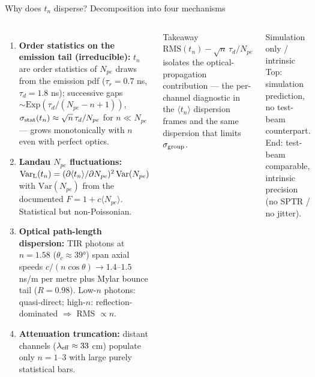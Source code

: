 \documentclass[aspectratio=169]{beamer}
\begin{document}
\begin{frame}{Why does $t_n$ disperse? Decomposition into four mechanisms}

\begin{columns}[T]
\begin{enumerate}\scriptsize
 \item \textbf{Order statistics on the emission tail (irreducible):}
       $t_n$ are order statistics of $N_{pe}$ draws from the emission pdf
       ($\tau_r=0.7$ ns, $\tau_d=1.8$ ns); successive gaps
       $\sim\mathrm{Exp}(\tau_d/(N_{pe}-n+1))$,
       $\sigma_{\rm stat}(t_n)\approx\sqrt{n}\,\tau_d/N_{pe}$ for $n\!\ll\!N_{pe}$
       --- grows monotonically with $n$ even with perfect optics.
 \item \textbf{Landau $N_{pe}$ fluctuations:}
       $\mathrm{Var}_{\rm L}(t_n)=(\partial\langle t_n\rangle/\partial N_{pe})^2\,\mathrm{Var}(N_{pe})$
       with $\mathrm{Var}(N_{pe})$ from the documented $F=1+c\langle N_{pe}\rangle$.
       Statistical but non-Poissonian.
 \item \textbf{Optical path-length dispersion:}
       TIR photons at $n=1.58$ ($\theta_c\approx39°$) span axial speeds
       $c/(n\cos\theta)\to1.4$--$1.5$ ns/m per metre plus Mylar bounce tail ($R=0.98$).
       Low-$n$ photons: quasi-direct; high-$n$: reflection-dominated $\Rightarrow$ RMS $\propto n$.
 \item \textbf{Attenuation truncation:}
       distant channels ($\lambda_{\rm eff}\approx33$ cm) populate only $n=1$--$3$
       with large purely statistical bars.
\end{enumerate}
\begin{block}{\footnotesize Takeaway}
\scriptsize
$\mathrm{RMS}(t_n) - \sqrt{n}\,\tau_d/N_{pe}$ isolates the optical-propagation
contribution --- the per-channel diagnostic in the $\langle t_n\rangle$ dispersion
frames and the same dispersion that limits $\sigma_{\rm group}$.
\end{block}
\begin{alertblock}{\footnotesize Simulation only / intrinsic}
\scriptsize
Top: simulation prediction, no test-beam counterpart.
End: test-beam comparable, intrinsic precision (no SPTR / no jitter).
\end{alertblock}
\end{columns}

\end{frame}
\end{document}

